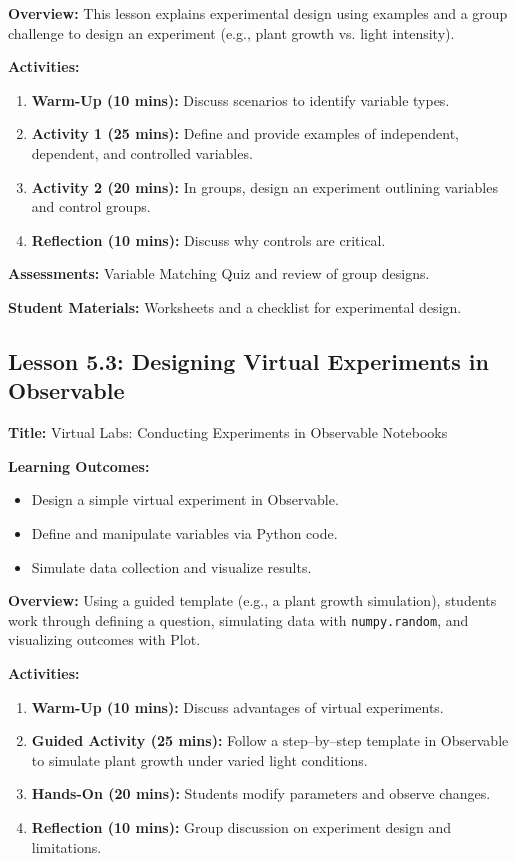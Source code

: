 \documentclass{tufte-book}
\begin{document}
\medskip
\textbf{Overview:}  
This lesson explains experimental design using examples and a group challenge to design an experiment (e.g., plant growth vs. light intensity).

\medskip
\textbf{Activities:}
\begin{enumerate}[label=\arabic*.]
    \item \textbf{Warm-Up (10 mins):} Discuss scenarios to identify variable types.
    \item \textbf{Activity 1 (25 mins):} Define and provide examples of independent, dependent, and controlled variables.
    \item \textbf{Activity 2 (20 mins):} In groups, design an experiment outlining variables and control groups.
    \item \textbf{Reflection (10 mins):} Discuss why controls are critical.
\end{enumerate}

\medskip
\textbf{Assessments:}  
Variable Matching Quiz and review of group designs.

\medskip
\textbf{Student Materials:}  
Worksheets and a checklist for experimental design.

\subsection{Lesson 5.3: Designing Virtual Experiments in Observable}
\textbf{Title:} Virtual Labs: Conducting Experiments in Observable Notebooks

\medskip
\textbf{Learning Outcomes:}
\begin{itemize}[leftmargin=*, label={\textbullet}]
    \item Design a simple virtual experiment in Observable.
    \item Define and manipulate variables via Python code.
    \item Simulate data collection and visualize results.
\end{itemize}

\medskip
\textbf{Overview:}  
Using a guided template (e.g., a plant growth simulation), students work through defining a question, simulating data with \texttt{numpy.random}, and visualizing outcomes with Plot.

\medskip
\textbf{Activities:}
\begin{enumerate}[label=\arabic*.]
    \item \textbf{Warm-Up (10 mins):} Discuss advantages of virtual experiments.
    \item \textbf{Guided Activity (25 mins):} Follow a step--by--step template in Observable to simulate plant growth under varied light conditions.
    \item \textbf{Hands-On (20 mins):} Students modify parameters and observe changes.
    \item \textbf{Reflection (10 mins):} Group discussion on experiment design and limitations.
\end{enumerate}
\end{document}
